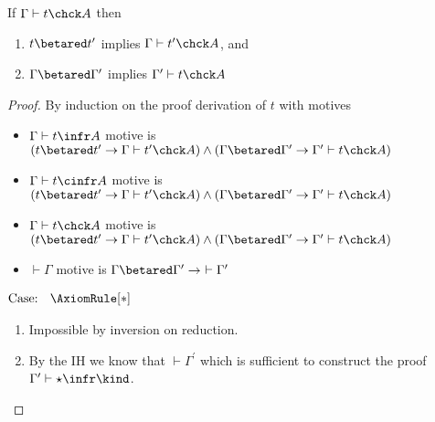 \begin{theorem}
    If $\Gamma \vdash t \chck A$ then 
    \begin{enumerate}
        \item {
            $t \betared t^\prime$ implies $\Gamma \vdash t^\prime \chck A$, and
        }
        \item {
            $\Gamma \betared \Gamma^\prime$ implies $\Gamma^\prime \vdash t \chck A$
        }
    \end{enumerate}
\end{theorem}
\begin{proof}
    By induction on the proof derivation of $t$ with motives
    \begin{itemize}
        \item {
            $\Gamma \vdash t \infr A$ motive is
            $(t \betared t^\prime \to \Gamma \vdash t^\prime \chck A) \wedge (\Gamma \betared \Gamma^\prime \to \Gamma^\prime \vdash t \chck A)$
        }
        \item {
            $\Gamma \vdash t \cinfr A$ motive is
            $(t \betared t^\prime \to \Gamma \vdash t^\prime \chck A) \wedge (\Gamma \betared \Gamma^\prime \to \Gamma^\prime \vdash t \chck A)$
        }
        \item {
            $\Gamma \vdash t \chck A$ motive is
            $(t \betared t^\prime \to \Gamma \vdash t^\prime \chck A) \wedge (\Gamma \betared \Gamma^\prime \to \Gamma^\prime \vdash t \chck A)$
        }
        \item {
            $\vdash \Gamma$ motive is
            $\Gamma \betared \Gamma^\prime \to\ \vdash \Gamma^\prime$
        }
    \end{itemize}

$\text{Case: }\begin{array}{c} \AxiomRule[*] \end{array}$
\begin{proofcase}
    \begin{enumerate}
        \item Impossible by inversion on reduction.
        \item {
            By the IH we know that $\vdash \Gamma^\prime$ which is sufficient to construct the proof $\Gamma^\prime \vdash \star \infr \kind$.
        }
    \end{enumerate}
\end{proofcase}


\end{proof}
